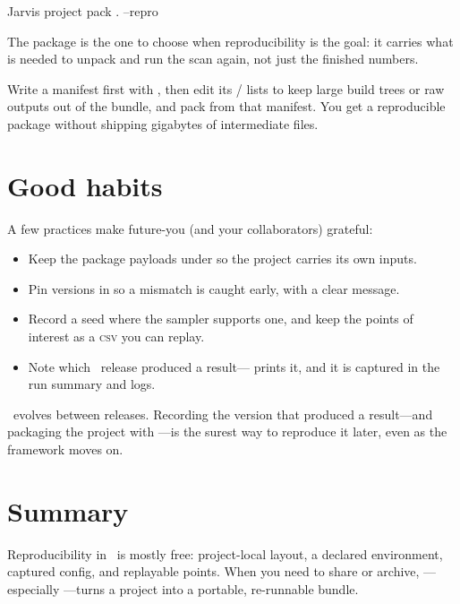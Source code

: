 \begin{shellbox}
Jarvis project pack . --repro
\end{shellbox}

\noindent The  package is the one to choose when reproducibility is the goal: it
carries what is needed to unpack and run the scan again, not just the finished numbers.

\begin{jtip}
Write a manifest first with , then edit its / lists
to keep large build trees or raw outputs out of the bundle, and pack from that manifest. You get a
reproducible package without shipping gigabytes of intermediate files.
\end{jtip}

\section{Good habits}
\label{sec:repro-habits}

A few practices make future-you (and your collaborators) grateful:

\begin{itemize}
  \item Keep the package payloads under  so the project carries its own inputs.
  \item Pin versions in  so a mismatch is caught early, with a clear message.
  \item Record a seed where the sampler supports one, and keep the points of interest as a
        \textsc{csv} you can replay.
  \item Note which \Jarvis\ release produced a result--- prints it, and it
        is captured in the run summary and logs.
\end{itemize}

\begin{jnote}
\Jarvis\ evolves between releases. Recording the version that produced a result---and packaging the
project with ---is the surest way to reproduce it later, even as the framework moves
on.
\end{jnote}

\section{Summary}
\label{sec:repro-summary}

Reproducibility in \Jarvis\ is mostly free: project-local layout, a declared environment, captured
config, and replayable points. When you need to share or archive, 
---especially ---turns a project into a portable, re-runnable bundle.
